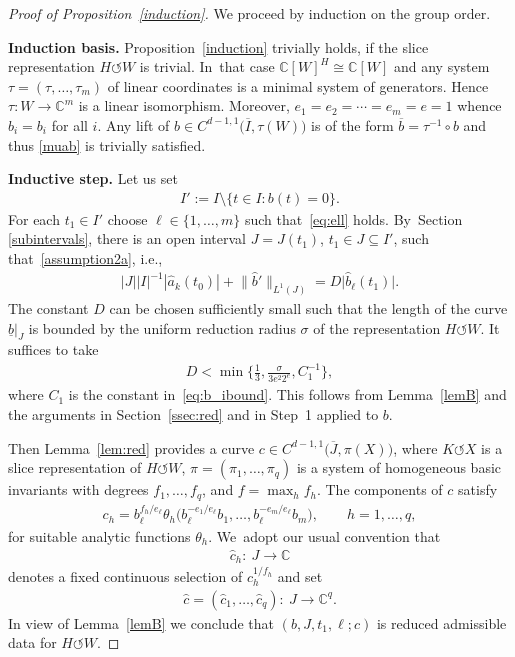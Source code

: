 \documentclass[11pt]{article}
\numberwithin{equation}{section}
\numberwithin{equation}{section}
\def\th{\theta}
\def\si{\sigma}
\def\ta{\tau}
\def\C{\mathbb{C}}
\def\ol{\overline}
\def\we{\hat}
\renewcommand{\o}{\circ}
\def\acts{\circlearrowleft}
\begin{document}
\begin{proof}[Proof of Proposition~\ref{induction}]
	We proceed by induction on the group order.


\medskip\noindent
{\bf Induction basis.}
Proposition~\ref{induction} trivially holds, if the slice representation $H \acts W$
is trivial. In~that case $\C[W]^H \cong \C[W]$ and any system $\ta = (\ta,\dots,\ta_m)$ of linear coordinates
is a minimal system of generators. Hence $\ta \colon W \to \C^m$ is a linear isomorphism.
Moreover, $e_1 = e_2 = \cdots = e_m = e =1$ whence $\we b_i = b_i$ for all $i$.
Any lift of $b \in C^{d-1,1}\big(\ol I,\ta(W)\big)$ is of the form $\ol b = \ta^{-1} \o b$ and thus
\eqref{muab} is trivially satisfied.

\medskip\noindent
{\bf Inductive step.}
Let us set
\begin{gather*}
 I' := I \setminus \{t \in I \colon b(t) = 0\}.
\end{gather*}
For each $t_1 \in I'$ choose $\ell \in \{1, \dots, m\}$ such that~\eqref{eq:ell} holds. By~Section \ref{subintervals}, there is an open interval $J = J(t_1)$, $t_1 \in J \subseteq I'$,
such that~\eqref{assumption2a}, i.e.,
\begin{gather*}
 | J| |I|^{-1} {|\we a_k(t_0)|}
 + \big\|\we b'\big\|_{L^1 (J)} = D \big|\we b_\ell(t_1)\big| .
\end{gather*}
The constant $D$
can be chosen sufficiently small such that the length of the curve $\underline b|_J$ is bounded by
the uniform reduction radius $\si$ of the representation $H \acts W$.
It suffices to take
\begin{gather} \label{D}
 D < \min\bigg\{\frac 1 3, \frac{\si}{3 e^2 2^{e}}, C_1^{-1}\bigg\},
\end{gather}
where $C_1$ is the constant in~\eqref{eq:b_ibound}.
This follows from Lemma~\ref{lemB}
and the arguments in Section~\ref{ssec:red} and in Step~1 applied to $b$.

Then Lemma~\ref{lem:red} provides a curve $c \in C^{d-1,1}\big(\ol J, \pi(X)\big)$, where $K \acts X$ is a slice representation
of $H \acts W$, $\pi = (\pi_1,\dots,\pi_q)$ is a system of homogeneous basic invariants with degrees $f_1,\dots,f_q$,
and $f = \max_h f_h$.
The components of $c$ satisfy
\begin{gather*} %
 c_h = b_\ell^{f_h/e_\ell} \th_h \big(b_\ell^{-e_1/e_\ell} b_1, \dots, b_\ell^{-e_m/e_\ell} b_m\big), \qquad h = 1,\dots,q,
\end{gather*}
for suitable analytic functions $\th_h$. We~adopt our usual convention that
\begin{gather*}
\we c_h \colon\ J \to \C
\end{gather*}
denotes a fixed continuous selection of $c_h ^{1/f_h}$ and
set
\begin{gather*}
	\we c = (\we c_1 ,\dots,\we c_q) \colon\ J \to \C^q.
\end{gather*}
In view of Lemma~\ref{lemB} we conclude that $(b,J,t_1,\ell; c)$ is reduced admissible data for $H \acts W$.








\end{proof}
\end{document}
